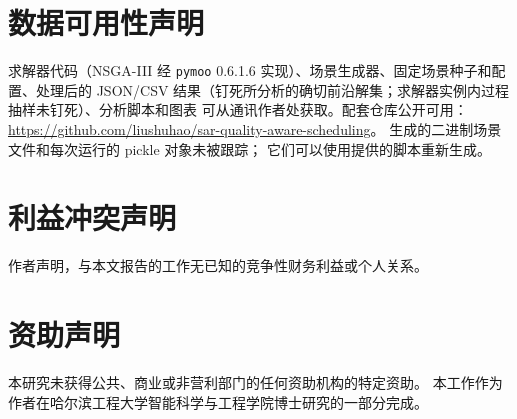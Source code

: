\documentclass[preprint,12pt,authoryear]{elsarticle}
\begin{document}
\section*{数据可用性声明}
求解器代码（NSGA-III 经 \texttt{pymoo} 0.6.1.6 实现）、场景生成器、固定场景种子和配置、处理后的 JSON/CSV 结果（钉死所分析的确切前沿解集；求解器实例内过程抽样未钉死）、分析脚本和图表
可从通讯作者处获取。配套仓库公开可用：
\url{https://github.com/liushuhao/sar-quality-aware-scheduling}。
生成的二进制场景文件和每次运行的 pickle 对象未被跟踪；
它们可以使用提供的脚本重新生成。
\section*{利益冲突声明}
作者声明，与本文报告的工作无已知的竞争性财务利益或个人关系。
\section*{资助声明}
本研究未获得公共、商业或非营利部门的任何资助机构的特定资助。
本工作作为作者在哈尔滨工程大学智能科学与工程学院博士研究的一部分完成。


\end{document}
